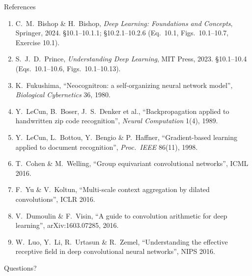 \documentclass[aspectratio=169, 11pt]{beamer}
\newcommand{\nosrc}{}       %
\begin{document}
\begin{frame}[allowframebreaks]{References}
  \nosrc
  \vspace{0.3em}
  {\scriptsize
  \begin{enumerate}\itemsep0.30em
    \item C.\ M.\ Bishop \& H.\ Bishop, \emph{Deep Learning: Foundations
          and Concepts}, Springer, 2024. \S10.1--10.1.1;
          \S10.2.1--10.2.6 (Eq.~10.1, Figs.~10.1--10.7,
          Exercise 10.1).
    \item S.\ J.\ D.\ Prince, \emph{Understanding Deep Learning}, MIT
          Press, 2023. \S10.1--10.4 (Eqs.~10.1--10.6,
          Figs.~10.1--10.13).
    \item K.\ Fukushima, ``Neocognitron: a self-organizing neural
          network model'', \emph{Biological Cybernetics} 36, 1980.
    \item Y.\ LeCun, B.\ Boser, J.\ S.\ Denker et al., ``Backpropagation
          applied to handwritten zip code recognition'', \emph{Neural
          Computation} 1(4), 1989.
    \item Y.\ LeCun, L.\ Bottou, Y.\ Bengio \& P.\ Haffner,
          ``Gradient-based learning applied to document recognition'',
          \emph{Proc.\ IEEE} 86(11), 1998.
    \item T.\ Cohen \& M.\ Welling, ``Group equivariant convolutional
          networks'', ICML 2016.
    \item F.\ Yu \& V.\ Koltun, ``Multi-scale context aggregation by
          dilated convolutions'', ICLR 2016.
    \item V.\ Dumoulin \& F.\ Visin, ``A guide to convolution arithmetic
          for deep learning'', arXiv:1603.07285, 2016.
    \item W.\ Luo, Y.\ Li, R.\ Urtasun \& R.\ Zemel, ``Understanding the
          effective receptive field in deep convolutional neural
          networks'', NIPS 2016.
  \end{enumerate}}
\end{frame}

\begin{frame}[standout]
  \nosrc
  Questions?
\end{frame}
\end{document}
